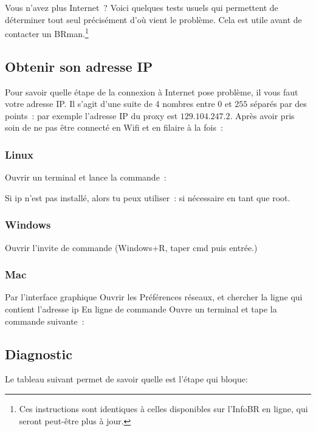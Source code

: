 \label{diagnostic}
Vous n'avez plus Internet~? Voici quelques tests usuels qui permettent de déterminer tout seul précisément d'où vient le problème. Cela est utile avant de contacter un BRman.\footnote{Ces instructions sont identiques à celles disponibles sur l'InfoBR en ligne, qui seront peut-être plus à jour.}

\subsection{Obtenir son adresse IP}
Pour savoir quelle étape de la connexion à Internet pose problème, il vous faut votre adresse IP. Il s'agit d'une suite de 4 nombres entre $0$ et $255$ séparés par des points~: par exemple l'adresse IP du proxy est $129.104.247.2$. Après avoir pris soin de ne pas être connecté en Wifi et en filaire à la fois~:

\subsubsection{Linux}
Ouvrir un terminal et lance la commande~:

Si ip n'est pas installé, alors tu peux utiliser~:
si nécessaire en tant que root.

\subsubsection{Windows}
Ouvrir l'invite de commande (Windows+R, taper cmd puis entrée.)

\subsubsection{Mac}
Par l'interface graphique
Ouvrir les Préférences réseaux, et chercher la ligne qui contient l'adresse ip
En ligne de commande
Ouvre un terminal et tape la commande suivante~:

\subsection{Diagnostic}
Le tableau suivant permet de savoir quelle est l'étape qui bloque:

